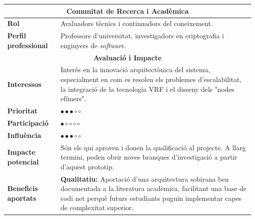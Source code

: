\begin{table}[H]
\centering
\renewcommand{\arraystretch}{1.5}
\begin{tabularx}{\textwidth}{|l|X|}
\hline
\multicolumn{2}{|c|}{\textbf{Comunitat de Recerca i Acadèmica}} \\ \hline
\textbf{Rol} & Avaluadors tècnics i continuadors del coneixement. \\ \hline
\textbf{Perfil professional} & Professors d'universitat, investigadors en criptografia i enginyers de \textit{software}. \\ \hline
\multicolumn{2}{|c|}{\textbf{Avaluació i Impacte}} \\ \hline
\textbf{Interessos} & Interès en la innovació arquitectònica del sistema, especialment en com es resolen els problemes d'escalabilitat, la integració de la tecnologia VRF i el disseny dels "nodes efímers". \\ \hline
\textbf{Prioritat} & \(\bullet \bullet \bullet \circ \circ\) \\ \hline
\textbf{Participació} & \(\bullet \circ \circ \circ \circ\) \\ \hline
\textbf{Influència} & \(\bullet \bullet \bullet \circ \circ\) \\ \hline
\textbf{Impacte potencial} & Són els qui aproven i donen la qualificació al projecte. A llarg termini, poden obrir noves branques d'investigació a partir d'aquest prototip. \\ \hline
\textbf{Beneficis aportats} & \textbf{Qualitatiu:} Aportació d'una arquitectura sobirana ben documentada a la literatura acadèmica, facilitant una base de codi net perquè futurs estudiants puguin implementar capes de complexitat superior. \\ \hline
\end{tabularx}
\end{table}